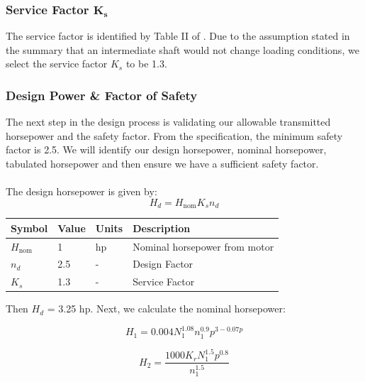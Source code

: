 \documentclass[letterpaper,12pt]{article}
\begin{document}
\subsubsection{Service Factor $\bm{K_s}$}
The service factor is identified by Table II of \cite{martin}. Due to the assumption stated in the summary that an intermediate shaft would not change loading conditions, we select the service factor $K_s$ to be 1.3.

\subsubsection{Design Power \& Factor of Safety}
The next step in the design process is validating our allowable transmitted horsepower and the safety factor. From the specification, the minimum safety factor is 2.5. We will identify our design horsepower, nominal horsepower, tabulated horsepower and then ensure we have a sufficient safety factor.
\\\\
The design horsepower is given by:
\begin{equation}
    H_d = H_{\text{nom}}K_s n_d
\end{equation}

\begin{center}
	\begin{tabular}{ |p{1.5cm}||p{1cm}|p{2cm}|p{7cm}|  }
		\hline
		Symbol & Value & Units & Description\\
		\hline
		$H_{\text{nom}}$ & 1 & hp & Nominal horsepower from motor\\
        $n_d$ & 2.5 & -  & Design Factor\\			
		$K_s$ & 1.3 & -  & Service Factor\\
		\hline
	\end{tabular}
\end{center}
Then $H_d$ = 3.25 hp. Next, we calculate the nominal horsepower:

\begin{equation}
    H_1 = 0.004 N_1^{1.08} n_1^{0.9} p^{3-0.07p}
\end{equation}

\begin{equation}
    H_2 = \frac{1000 K_r N_1^{1.5} p^{0.8}}{n_1^{1.5}}
\end{equation}
\end{document}
